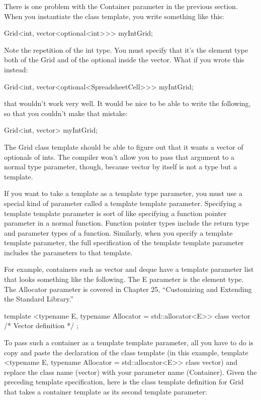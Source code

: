 
There is one problem with the Container parameter in the previous section. When you instantiate the class template, you write something like this:

\begin{cpp}
Grid<int, vector<optional<int>>> myIntGrid;
\end{cpp}

Note the repetition of the int type. You must specify that it’s the element type both of the Grid and of the optional inside the vector. What if you wrote this instead:

\begin{cpp}
Grid<int, vector<optional<SpreadsheetCell>>> myIntGrid;
\end{cpp}

that wouldn’t work very well. It would be nice to be able to write the following, so that you couldn’t make that mistake:

\begin{cpp}
Grid<int, vector> myIntGrid;
\end{cpp}

The Grid class template should be able to figure out that it wants a vector of optionals of ints.
The compiler won’t allow you to pass that argument to a normal type parameter, though, because vector by itself is not a type but a template.

If you want to take a template as a template type parameter, you must use a special kind of parameter called a template template parameter. Specifying a template template parameter is sort of like specifying a function pointer parameter in a normal function. Function pointer types include the return type and parameter types of a function. Similarly, when you specify a template template parameter, the full specification of the template template parameter includes the parameters to that template.

For example, containers such as vector and deque have a template parameter list that looks something like the following. The E parameter is the element type. The Allocator parameter is covered in Chapter 25, “Customizing and Extending the Standard Library.”

\begin{cpp}
template <typename E, typename Allocator = std::allocator<E>>
class vector { /* Vector definition */ };
\end{cpp}

To pass such a container as a template template parameter, all you have to do is copy and paste the declaration of the class template (in this example, template <typename E, typename Allocator = std::allocator<E>{}> class vector) and replace the class name (vector) with your parameter name (Container). Given the preceding template specification, here is the class template definition for Grid that takes a container template as its second template parameter:


